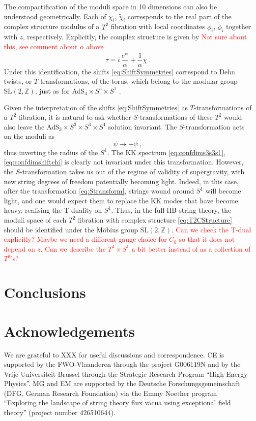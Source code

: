 \documentclass[a4paper, 11pt]{article}
\numberwithin{equation}{section}
\newcommand{\ts}[1]{\widetilde{#1}}
\newcommand{\SL}[1]{\mathrm{SL}( #1 )}
\newcommand{\+}{\oplus}
\newcommand{\EM}[1]{\textcolor{red}{#1}}
\begin{document}
The compactification of the moduli space in 10 dimensions can also be understood geometrically. Each of $\chi_i$, $\ts{\chi}_i$ corresponds to the real part of the complex structure modulus of a $T^2$ fibration with local coordinates $\phi_i$, $\ts{\phi}_i$ together with $z$, respectively. Explicitly, the complex structure is given by \EM{Not sure about this, see comment about $\alpha$ above}
\begin{equation} \label{eq:T2CStructure}
	\tau = i\,\frac{e^\psi}{\alpha} + \frac1\alpha \chi \,.
\end{equation}
Under this identification, the shifts \eqref{eq:ShiftSymmetries} correspond to Dehn twists, or $T$-transformations, of the torus, which belong to the modular group $\SL{2,\mathbb{Z}}$, just as for AdS$_4 \times S^5 \times S^1$ \cite{Giambrone:2021zvp,Giambrone:2021wsm}.

Given the interpretation of the shifts \eqref{eq:ShiftSymmetries} as $T$-transformations of a $T^2$-fibration, it is natural to ask whether $S$-transformations of these $T^2$ would also leave the AdS$_3 \times S^3 \times S^3 \times S^1$ solution invariant. The $S$-transformation acts on the moduli as
\begin{equation} \label{eq:Stransform}
	\psi \rightarrow - \psi \,,
\end{equation}
thus inverting the radius of the $S^1$. The KK spectrum \eqref{eq:confdims3s3s1}, \eqref{eq:confdimshiftchi} is clearly not invariant under this transformation. However, the $S$-transformation takes us out of the regime of validity of supergravity, with new string degrees of freedom potentially becoming light. Indeed, in this case, after the transformation \eqref{eq:Stransform}, strings wound around $S^1$ will become light, and one would expect them to replace the KK modes that have become heavy, realising the T-duality on $S^1$. Thus, in the full IIB string theory, the moduli space of each $T^2$ fibration with complex structure \eqref{eq:T2CStructure} should be identified under the M\"{o}bius group $\SL{2,\mathbb{Z}}$. \EM{Can we check the T-dual explicitly? Maybe we need a different gauge choice for $C_6$ so that it does not depend on $z$. Can we describe the $T^4 \times S^1$ a bit better instead of as a collection of $T^2$'s?}


\section{Conclusions} \label{s:Conclusions}

\section*{Acknowledgements}
We are grateful to XXX for useful discussions and correspondence. CE is supported by the FWO-Vlaanderen through the project G006119N and by the Vrije Universiteit Brussel through the Strategic Research Program ``High-Energy Physics''. MG and EM are supported by the Deutsche Forschungsgemeinschaft (DFG, German Research Foundation) via the Emmy Noether program ``Exploring the landscape of string theory flux vacua using exceptional field theory'' (project number 426510644).
\end{document}
